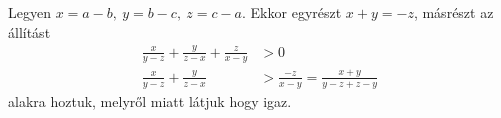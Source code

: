 Legyen $x=a-b,\ y=b-c,\ z=c-a.$ Ekkor egyrészt $x+y=-z$, másrészt az állítást
\begin{align*}
   \frac{x}{y-z}+\frac{y}{z-x}+\frac{z}{x-y} &> 0 \\
   \frac{x}{y-z}+\frac{y}{z-x} &> \frac{-z}{x-y} = \frac{x+y}{y-z + z - y}
\end{align*}
alakra hoztuk, melyről  miatt látjuk hogy igaz.

